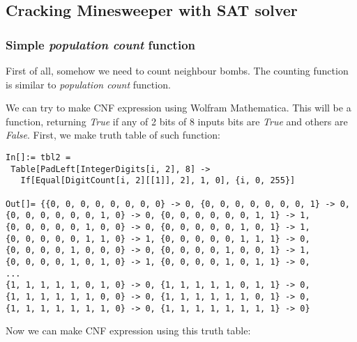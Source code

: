 \subsection{Cracking Minesweeper with SAT solver}
\label{minesweeper_SAT}

\renewcommand{\CURPATH}{equations/minesweeper/2_SAT}

\subsubsection{Simple \emph{population count} function}

First of all, somehow we need to count neighbour bombs.
The counting function is similar to \emph{population count} function.

We can try to make \ac{CNF} expression using Wolfram Mathematica.
This will be a function, returning \emph{True}
if any of 2 bits of 8 inputs bits are \emph{True} and others are \emph{False}.
First, we make truth table of such function:

\begin{lstlisting}
In[]:= tbl2 = 
 Table[PadLeft[IntegerDigits[i, 2], 8] -> 
   If[Equal[DigitCount[i, 2][[1]], 2], 1, 0], {i, 0, 255}]

Out[]= {{0, 0, 0, 0, 0, 0, 0, 0} -> 0, {0, 0, 0, 0, 0, 0, 0, 1} -> 0, 
{0, 0, 0, 0, 0, 0, 1, 0} -> 0, {0, 0, 0, 0, 0, 0, 1, 1} -> 1, 
{0, 0, 0, 0, 0, 1, 0, 0} -> 0, {0, 0, 0, 0, 0, 1, 0, 1} -> 1, 
{0, 0, 0, 0, 0, 1, 1, 0} -> 1, {0, 0, 0, 0, 0, 1, 1, 1} -> 0, 
{0, 0, 0, 0, 1, 0, 0, 0} -> 0, {0, 0, 0, 0, 1, 0, 0, 1} -> 1, 
{0, 0, 0, 0, 1, 0, 1, 0} -> 1, {0, 0, 0, 0, 1, 0, 1, 1} -> 0, 
...
{1, 1, 1, 1, 1, 0, 1, 0} -> 0, {1, 1, 1, 1, 1, 0, 1, 1} -> 0, 
{1, 1, 1, 1, 1, 1, 0, 0} -> 0, {1, 1, 1, 1, 1, 1, 0, 1} -> 0, 
{1, 1, 1, 1, 1, 1, 1, 0} -> 0, {1, 1, 1, 1, 1, 1, 1, 1} -> 0}
\end{lstlisting}

Now we can make \ac{CNF} expression using this truth table:

